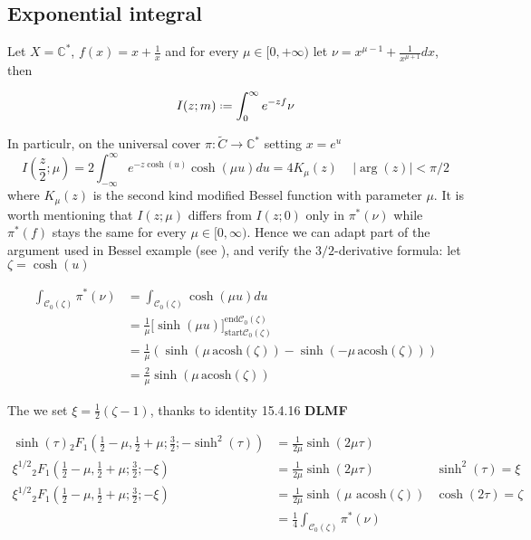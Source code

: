 \documentclass{article}
\newcommand{\C}{\mathbb{C}}
\begin{document}
\subsection{Exponential integral}

Let $X=\C^*$, $f(x)=x+\frac{1}{x}$ and for every $\mu\in [0,+\infty)$ let $\nu=x^{\mu-1}+\frac{1}{x^{\mu+1}}dx$, then  

\begin{equation}
I(z;m)\defeq\int_{0}^{\infty}e^{-zf}\nu
\end{equation}

In particulr, on the universal cover $\pi\colon\tilde{C}\to \C^*$ setting $x=e^u$ 
\begin{equation}
I(\frac{z}{2};\mu)=2\int_{-\infty}^{\infty}e^{-z\cosh(u)}\cosh(\mu u)du=4K_\mu(z)\,\quad |\arg(z)|<\pi/2
\end{equation} 
where $K_\mu(z)$ is the second kind modified Bessel function with parameter $\mu$. It is worth mentioning that $I(z;\mu)$ differs from $I(z;0)$ only in $\pi^*(\nu)$ while $\pi^*(f)$ stays the same for every $\mu\in [0,\infty)$. Hence we can adapt part of the argument used in Bessel example (see ), and verify the $3/2$-derivative formula: let $\zeta=\cosh(u)$

\begin{align*}
\int_{\mathcal{C}_0(\zeta)}\pi^*(\nu)&=\int_{\mathcal{C}_0(\zeta)}\cosh(\mu u)du\\
&=\frac{1}{\mu}\Big[\sinh(\mu u)\Big]_{\mathrm{start}\mathcal{C}_0(\zeta)}^{\mathrm{end}\mathcal{C}_0(\zeta)}\\
&=\frac{1}{\mu}\left(\sinh\left(\mu\,\mathrm{acosh}\left(\zeta\right)\right)-\sinh\left(-\mu\,\mathrm{acosh}\left(\zeta\right)\right)\right)\\
&=\frac{2}{\mu}\sinh\left(\mu\,\mathrm{acosh}\left(\zeta\right)\right)
\end{align*}


The we set $\xi=\frac{1}{2}\left(\zeta-1\right)$, thanks to identity 15.4.16 \textbf{DLMF}

\begin{align*}
\sinh(\tau) {}_2F_1\left(\frac{1}{2}-\mu,\frac{1}{2}+\mu;\frac{3}{2};-\sinh^2(\tau)\right)&=\frac{1}{2\mu}\sinh(2\mu\tau) & \\
\xi^{1/2} {}_2F_1\left(\frac{1}{2}-\mu,\frac{1}{2}+\mu;\frac{3}{2};-\xi\right)&=\frac{1}{2\mu}\sinh(2\mu\tau)  & \sinh^2(\tau)=\xi \\
\xi^{1/2} {}_2F_1\left(\frac{1}{2}-\mu,\frac{1}{2}+\mu;\frac{3}{2};-\xi\right)&=\frac{1}{2\mu}\sinh(\mu\,\,\mathrm{acosh}\left(\zeta\right))  & \cosh(2\tau)=\zeta \\
&=\frac{1}{4}\int_{\mathcal{C}_0(\zeta)}\pi^*(\nu) &\\
\end{align*}
\end{document}

